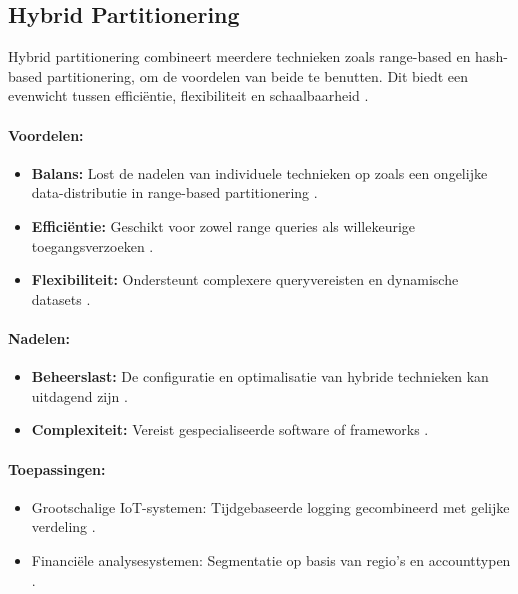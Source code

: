 \subsection{Hybrid Partitionering}
Hybrid partitionering combineert meerdere technieken zoals range-based en hash-based partitionering, om de voordelen van beide te benutten. Dit biedt een evenwicht tussen efficiëntie, flexibiliteit en schaalbaarheid \autocite{Mahmud2020}.

\paragraph{Voordelen:}
\begin{itemize}
    \item \textbf{Balans:} Lost de nadelen van individuele technieken op zoals een ongelijke data-distributie in range-based partitionering \autocite{Mahmud2020}.
    \item \textbf{Efficiëntie:} Geschikt voor zowel range queries als willekeurige toegangsverzoeken \autocite{Mahmud2020}.
    \item \textbf{Flexibiliteit:} Ondersteunt complexere queryvereisten en dynamische datasets \autocite{Mahmud2020}.
\end{itemize}

\paragraph{Nadelen:}
\begin{itemize}
    \item \textbf{Beheerslast:} De configuratie en optimalisatie van hybride technieken kan uitdagend zijn \autocite{Mahmud2020}.
    \item \textbf{Complexiteit:} Vereist gespecialiseerde software of frameworks \autocite{Mahmud2020}.
\end{itemize}

\paragraph{Toepassingen:}
\begin{itemize}
    \item Grootschalige IoT-systemen: Tijdgebaseerde logging gecombineerd met gelijke verdeling \autocite{Mahmud2020}.
    \item Financiële analysesystemen: Segmentatie op basis van regio's en accounttypen \autocite{Mahmud2020}.
\end{itemize}

